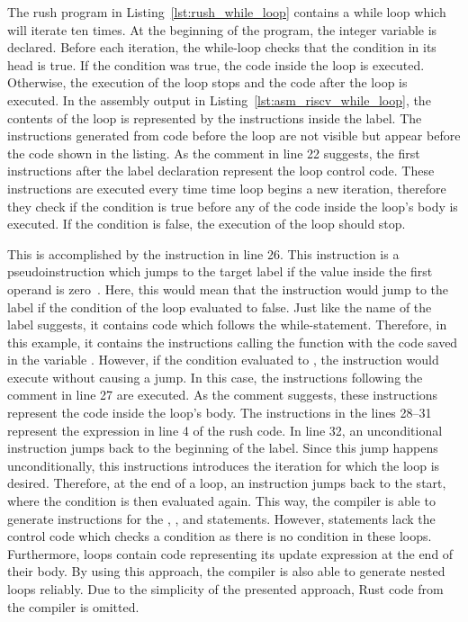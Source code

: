 The rush program in Listing~\ref{lst:rush_while_loop} contains a while loop which will iterate ten times.
At the beginning of the program, the integer variable  is declared.
Before each iteration, the while-loop checks that the condition in its head is true.
If the condition was true, the code inside the loop is executed.
Otherwise, the execution of the loop stops and the code after the loop is executed.
In the assembly output in Listing~\ref{lst:asm_riscv_while_loop}, the contents of the loop is represented by the instructions inside the  label.
The instructions generated from code before the loop are not visible but appear before the code shown in the listing.
As the comment in line 22 suggests, the first instructions after the label declaration represent the loop control code.
These instructions are executed every time time loop begins a new iteration, therefore they check if the condition is true before any of the code inside the loop's body is executed.
If the condition is false, the execution of the loop should stop.

This is accomplished by the  instruction in line 26.
This instruction is a pseudoinstruction which jumps to the target label if the value inside the first operand is zero~\cite[p.~105]{Waterman2019}.
Here, this would mean that the instruction would jump to the  label if the condition of the loop evaluated to false.
Just like the name of the  label suggests, it contains code which follows the while-statement.
Therefore, in this example, it contains the instructions calling the  function with the code saved in the variable .
However, if the condition evaluated to , the  instruction would execute without causing a jump.
In this case, the instructions following the comment in line 27 are executed.
As the comment suggests, these instructions represent the code inside the loop's body.
The instructions in the lines 28--31 represent the expression  in line 4 of the rush code.
In line 32, an unconditional  instruction jumps back to the beginning of the  label.
Since this jump happens unconditionally, this instructions introduces the iteration for which the loop is desired.
Therefore, at the end of a loop, an instruction jumps back to the start, where the condition is then evaluated again.
This way, the compiler is able to generate instructions for the , , and  statements.
However,  statements lack the control code which checks a condition as there is no condition in these loops.
Furthermore,  loops contain code representing its update expression at the end of their body.
By using this approach, the compiler is also able to generate nested loops reliably.
Due to the simplicity of the presented approach, Rust code from the compiler is omitted.
